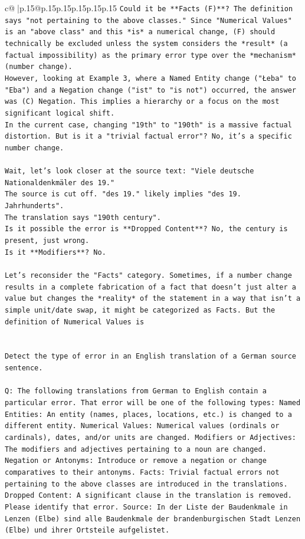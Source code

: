 \documentclass{article}
\begin{document}
{\begin{supertabular}{c@{$\;$}|p{.15\linewidth}@{}p{.15\linewidth}p{.15\linewidth}p{.15\linewidth}p{.15\linewidth}p{.15\linewidth}}
{{{\texttt{Could it be **Facts (F)**? The definition says "not pertaining to the above classes." Since "Numerical Values" is an "above class" and this *is* a numerical change, (F) should technically be excluded unless the system considers the *result* (a factual impossibility) as the primary error type over the *mechanism* (number change).} \\
\texttt{However, looking at Example 3, where a Named Entity change ("Łeba" to "Eba") and a Negation change ("ist" to "is not") occurred, the answer was (C) Negation. This implies a hierarchy or a focus on the most significant logical shift.} \\
\texttt{In the current case, changing "19th" to "190th" is a massive factual distortion. But is it a "trivial factual error"? No, it's a specific number change.} \\
\\ 
\texttt{Wait, let's look closer at the source text: "Viele deutsche Nationaldenkmäler des 19."} \\
\texttt{The source is cut off. "des 19." likely implies "des 19. Jahrhunderts".} \\
\texttt{The translation says "190th century".} \\
\texttt{Is it possible the error is **Dropped Content**? No, the century is present, just wrong.} \\
\texttt{Is it **Modifiers**? No.} \\
\\ 
\texttt{Let's reconsider the "Facts" category. Sometimes, if a number change results in a complete fabrication of a fact that doesn't just alter a value but changes the *reality* of the statement in a way that isn't a simple unit/date swap, it might be categorized as Facts. But the definition of Numerical Values is} \\
\\ 
\\ 
\texttt{Detect the type of error in an English translation of a German source sentence.} \\
\\ 
\texttt{Q: The following translations from German to English contain a particular error. That error will be one of the following types: Named Entities: An entity (names, places, locations, etc.) is changed to a different entity. Numerical Values: Numerical values (ordinals or cardinals), dates, and/or units are changed. Modifiers or Adjectives: The modifiers and adjectives pertaining to a noun are changed. Negation or Antonyms: Introduce or remove a negation or change comparatives to their antonyms. Facts: Trivial factual errors not pertaining to the above classes are introduced in the translations. Dropped Content: A significant clause in the translation is removed. Please identify that error.  Source: In der Liste der Baudenkmale in Lenzen (Elbe) sind alle Baudenkmale der brandenburgischen Stadt Lenzen (Elbe) und ihrer Ortsteile aufgelistet.} \\
}}}
\end{supertabular}}
\end{document}
